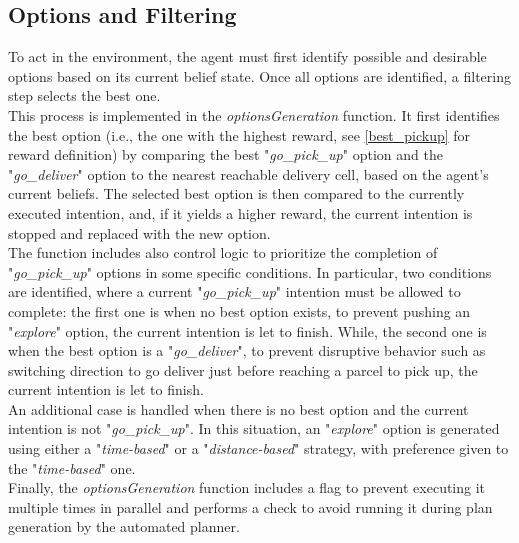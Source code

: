     \subsection{Options and Filtering}
        To act in the environment, the agent must first identify possible and desirable options based on its current belief state. Once all options are identified, a filtering step selects the best one.
        \medskip\\
        This process is implemented in the \textit{optionsGeneration} function. It first identifies the best option (i.e., the one with the highest reward, see \ref{best_pickup} for reward definition) by comparing the best "\textit{go\_pick\_up}" option and the "\textit{go\_deliver}" option to the nearest reachable delivery cell, based on the agent's current beliefs. The selected best option is then compared to the currently executed intention, and, if it yields a higher reward, the current intention is stopped and replaced with the new option.
        \medskip\\
        The function includes also control logic to prioritize the completion of "\textit{go\_pick\_up}" options in some specific conditions. In particular, two conditions are identified, where a current "\textit{go\_pick\_up}" intention must be allowed to complete: the first one is when no best option exists, to prevent pushing an "\textit{explore}" option, the current intention is let to finish. While, the second one is when the best option is a "\textit{go\_deliver}", to prevent disruptive behavior such as switching direction to go deliver just before reaching a parcel to pick up, the current intention is let to finish.
        \medskip\\
        An additional case is handled when there is no best option and the current intention is not "\textit{go\_pick\_up}". In this situation, an "\textit{explore}" option is generated using either a "\textit{time-based}" or a "\textit{distance-based}" strategy, with preference given to the "\textit{time-based}" one.
        \medskip\\
        Finally, the \textit{optionsGeneration} function includes a flag to prevent executing it multiple times in parallel and performs a check to avoid running it during plan generation by the automated planner.
        

